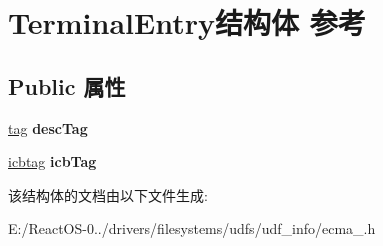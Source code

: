\hypertarget{struct_terminal_entry}{}\section{Terminal\+Entry结构体 参考}
\label{struct_terminal_entry}
\subsection*{Public 属性}
\begin{DoxyCompactItemize}
\item 
\mbox{\label{struct_terminal_entry_ade7763636bc9ff323faf87062f88aff3}} 
\hyperlink{structtag}{tag} {\bfseries desc\+Tag}
\item 
\mbox{\label{struct_terminal_entry_a6195d24e41b15385018e9b09c7a6b61a}} 
\hyperlink{structicbtag}{icbtag} {\bfseries icb\+Tag}
\end{DoxyCompactItemize}


该结构体的文档由以下文件生成\+:\begin{DoxyCompactItemize}
\item 
E\+:/\+React\+O\+S-\/0../drivers/filesystems/udfs/udf\+\_\+info/ecma\+\_.\+h\end{DoxyCompactItemize}
